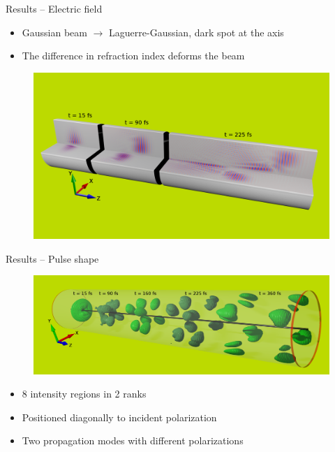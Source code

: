 \documentclass{beamer}
\newlength{\wideitemsep}
\let\olditem\item
\renewcommand{\item}{\setlength{\itemsep}{\wideitemsep}\olditem}
\begin{document}
\begin{frame}{Results -- Electric field}

\begin{block}{}
  \begin{itemize}
   \item Gaussian beam $\rightarrow$ Laguerre-Gaussian, dark spot at the axis
   \item The difference in refraction index deforms the beam
   \vspace{.86ex}
\end{itemize}
\end{block}

\begin{figure}[h]
\centering
 \includegraphics[width=\textwidth,clip,trim=0mm 50mm 0mm 80mm]{./render_t}
\end{figure}

\end{frame}


\begin{frame}{Results -- Pulse shape}

 \begin{figure}[h]
  \centering
  \includegraphics[width=\textwidth]{./intensity_gauss_t}
 \end{figure}

\vspace{-15pt}

\begin{block}{}
  \begin{itemize}
    \item 8 intensity regions in 2 ranks
    \item Positioned diagonally to incident polarization
    \item Two propagation modes with different polarizations
  \end{itemize}
\end{block}
\end{frame}
\end{document}
